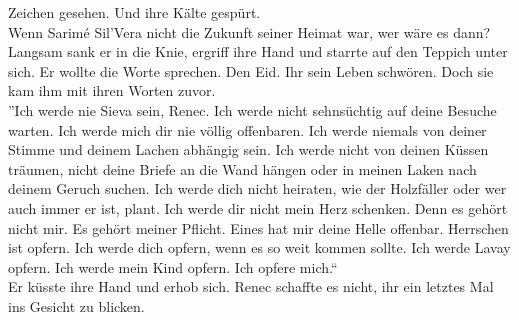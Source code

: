 Zeichen gesehen. Und ihre Kälte gespürt.\\
Wenn Sarimé Sil'Vera nicht die Zukunft seiner Heimat war, wer wäre es dann?\\
Langsam sank er in die Knie, ergriff ihre Hand und starrte auf den Teppich unter sich. Er wollte 
die Worte sprechen. Den Eid. Ihr sein Leben schwören. Doch sie kam ihm mit ihren Worten zuvor.\\
''Ich werde nie Sieva sein, Renec. Ich werde nicht sehnsüchtig auf deine Besuche warten. Ich werde 
mich dir nie völlig offenbaren. Ich werde niemals von deiner Stimme und deinem Lachen abhängig 
sein. Ich werde nicht von deinen Küssen träumen, nicht deine Briefe an die Wand hängen oder in 
meinen Laken nach deinem Geruch suchen. Ich werde dich nicht heiraten, wie der Holzfäller oder 
wer auch immer er ist, plant. Ich werde dir nicht mein Herz schenken. Denn es gehört nicht mir. 
Es gehört meiner Pflicht. Eines hat mir deine Helle offenbar. Herrschen ist opfern. Ich werde dich 
opfern, wenn es so weit kommen sollte. Ich werde Lavay opfern. Ich werde mein Kind opfern. Ich 
opfere mich.``\\
Er küsste ihre Hand und erhob sich. Renec schaffte es nicht, ihr ein letztes Mal ins Gesicht zu 
blicken.\\

